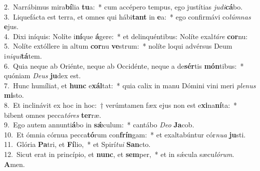 {2.~}Narrábimus mira\textbf{bí}lia \textbf{tu}a:~* cum accépero tempus, ego justítias \textit{ju}\textit{di}\textbf{cá}bo.\\
{3.~}Liquefácta est terra, et omnes qui hábi\textbf{tant} in \textbf{e}a:~* ego confirmávi co\textit{lúm}\textit{nas} \textbf{e}jus.\\
{4.~}Dixi iníquis: Nolíte i\textbf{ní}que \textbf{á}gere:~* et delinquéntibus: Nolíte exal\textit{tá}\textit{re} \textbf{cor}nu:\\
{5.~}Nolíte extóllere in altum \textbf{cor}nu \textbf{ve}strum:~* nolíte loqui advérsus Deum i\textit{ni}\textit{qui}\textbf{tá}tem.\\
{6.~}Quia neque ab Oriénte, neque ab Occidénte, neque a de\textbf{sér}tis \textbf{món}tibus:~* quóniam \textit{De}\textit{us} \textbf{ju}dex est.\\
{7.~}Hunc humíliat, et \textbf{hunc} e\textbf{xál}tat:~* quia calix in manu Dómini vini meri \textit{ple}\textit{nus} \textbf{mi}sto.\\
{8.~}Et inclinávit ex hoc in hoc:~† verúmtamen fæx ejus non est e\textbf{xi}na\textbf{ní}ta:~* bibent omnes pecca\textit{tó}\textit{res} \textbf{ter}ræ.\\
{9.~}Ego autem annunti\textbf{á}bo in \textbf{sǽ}culum:~* cantábo \textit{De}\textit{o} \textbf{Ja}cob.\\
{10.~}Et ómnia córnua pecca\textbf{tó}rum con\textbf{frín}gam:~* et exaltabúntur cór\textit{nu}\textit{a} \textbf{ju}sti.\\
{11.~}Glória \textbf{Pa}tri, et \textbf{Fí}lio,~* et Spirí\textit{tu}\textit{i} \textbf{San}cto.\\
{12.~}Sicut erat in princípio, et \textbf{nunc}, et \textbf{sem}per,~* et in sǽcula sæcu\textit{ló}\textit{rum}. \textbf{A}men.\\
